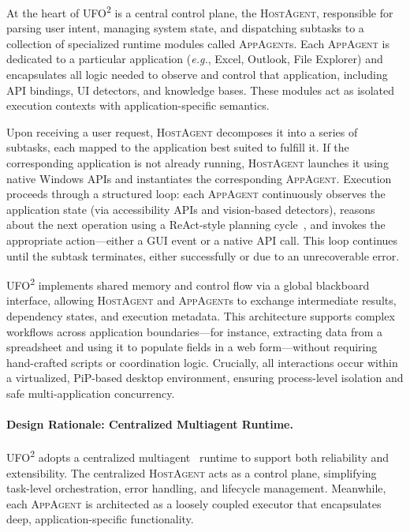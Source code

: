 \documentclass[sigplan,10pt]{acmart}
\newcommand{\name}{\textsc{UFO}\textsuperscript{2}\xspace}
\newcommand{\hosta}{\textsc{HostAgent}\xspace}
\newcommand{\appa}{\textsc{AppAgent}\xspace}
\newcommand{\appas}{\textsc{AppAgent}s\xspace}
\newcommand{\eg}{\textit{e.g.},\xspace}
\begin{document}
At the heart of \name is a central control plane, the \hosta, responsible for parsing user intent, managing system state, and dispatching subtasks to a collection of specialized runtime modules called \appas. Each \appa is dedicated to a particular application (\eg Excel, Outlook, File Explorer) and encapsulates all logic needed to observe and control that application, including API bindings, UI detectors, and knowledge bases. These modules act as isolated execution contexts with application-specific semantics.

Upon receiving a user request, \hosta decomposes it into a series of subtasks, each mapped to the application best suited to fulfill it. If the corresponding application is not already running, \hosta launches it using native Windows APIs and instantiates the corresponding \appa. Execution proceeds through a structured loop: each \appa continuously observes the application state (via accessibility APIs and vision-based detectors), reasons about the next operation using a ReAct-style planning cycle~\cite{yao2023react}, and invokes the appropriate action—either a GUI event or a native API call. This loop continues until the subtask terminates, either successfully or due to an unrecoverable error.

\name implements shared memory and control flow via a global blackboard interface, allowing \hosta and \appas to exchange intermediate results, dependency states, and execution metadata. This architecture supports complex workflows across application boundaries—for instance, extracting data from a spreadsheet and using it to populate fields in a web form—without requiring hand-crafted scripts or coordination logic. Crucially, all interactions occur within a virtualized, PiP-based desktop environment, ensuring process-level isolation and safe multi-application concurrency.

\paragraph{Design Rationale: Centralized Multiagent Runtime.}

\name adopts a centralized multiagent~\cite{zhang2024ufo, qiao2023taskweaver, han2024llm, wang2024survey} runtime to support both reliability and extensibility. The centralized \hosta acts as a control plane, simplifying task-level orchestration, error handling, and lifecycle management. Meanwhile, each \appa is architected as a loosely coupled executor that encapsulates deep, application-specific functionality. 
\end{document}
